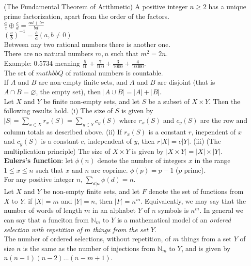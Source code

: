 \documentclass[10pt,landscape]{article}
\begin{document}
\begin{multicols}{3}
(The Fundamental Theorem of Arithmetic) A positive integer $n \geq 2$ has a unique prime factorization, apart from the order of the factors.\\
$\frac{a}{c} \oplus \frac{c}{d} = \frac{ad + bc}{bd}$\\
$\left( \frac{a}{b} \right)^{-1} = \frac{b}{a} (a,b \neq 0)$\\
Between any two rational numbers there is another one.\\
There are no natural numbers $m, n$ such that $m^2 =2n$.\\
Example: 0.5734 meaning $\frac{5}{10} + \frac{7}{100} + \frac{3}{1000}
+ \frac {4}{10000}$.\\
The set of $mathbb{Q}$ of rational numbers is countable.\\
If $A$ and $B$ are non-empty finite sets, and $A$ and $B$ are disjoint
(that is $A \cap B = \varnothing$, the empty set), then $|A \cup B| =
|A| + |B|$.\\
Let $X$ and $Y$ be finite non-empty sets, and let $S$ be a subset of
$X \times Y$. Then the following results hold.
(i) The size of $S$ is given by $|S| = \displaystyle\sum_{x \in X} r_{x}(S) =
\displaystyle\sum_{y \in Y} c_{y}(S)$ where $r_{x}(S)$ and $c_{y}(S)$
are the row and column totals as described above.
(ii) If $r_{x}(S)$ is a constant $r$, inependent of $x$ and $c_{y}(S)$
is a constant $c$, independent of $y$, then $r|X| = c|Y|$.
(iii) (The multiplication principle) The size of $X \times Y$ is given
by $|X \times Y| = |X| \times |Y|$.\\
\textbf{Eulers's function}: let $\phi(n)$ denote the number of
integers $x$ in the range $1 \leq x \leq n$ such that $x$ and $n$ are
coprime. $\phi(p) = p-1$ ($p$ prime).\\
For any positive integer $n$, $\displaystyle\sum_{d|n} \phi(d)=n$.\\
Let $X$ and $Y$ be non-empty finite sets, and let $F$ denote the set
of functions from $X$ to $Y$. if $|X| = m$ and $|Y| = n$, then $|F| =
n^{m}$. Equivalently, we may say that the number of words of length
$m$ in an alphabet $Y$ of $n$ symbols is $n^{m}$. In general we can
say that a funciton from $\mathbb{N}_{m}$ to $Y$ is a mathematical
model of an \textit{ordered selection with repetition of $m$ things
  from the set $Y$}.\\
The number of ordered selections, without repetition, of $m$ things
from a set $Y$ of size $n$ is the same as the number of injections
from $\mathbb{N}_{m}$ to $Y$, and is given by $n(n-1)(n-2)\dots(n-m+1)$.\\

\end{multicols}
\end{document}
